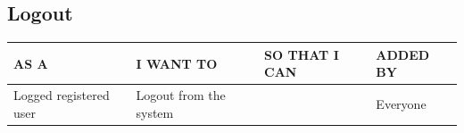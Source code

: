 \documentclass[11pt, a4paper]{article}
\begin{document}
\subsection{Logout}
\begin{table}[H]
    \centering
    \begin{tabular}{|p{4.5cm}|p{4cm}|p{4cm}|p{4cm}|}
    \hline
    \rowcolor[HTML]{EFEFEF} 
    AS A                   & I WANT TO              & SO THAT I CAN & ADDED BY \\ \hline
    Logged registered user & Logout from the system &               & Everyone \\ \hline
    \end{tabular}
\end{table}
\begin{figure}[H]
    \centering
\end{figure}
\end{document}
